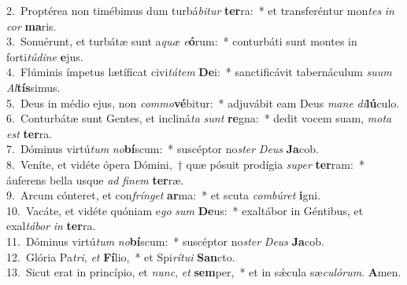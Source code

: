 {2.~}Proptérea non timébimus dum turbá\textit{bi}\textit{tur} \textbf{ter}ra:~* et transferéntur mon\textit{tes} \textit{in} \textit{cor} \textbf{ma}ris.\\
{3.~}Sonuérunt, et turbátæ sunt a\textit{quæ} \textit{e}\textbf{ó}rum:~* conturbáti sunt montes in forti\textit{tú}\textit{di}\textit{ne} \textbf{e}jus.\\
{4.~}Flúminis ímpetus lætíficat civi\textit{tá}\textit{tem} \textbf{De}i:~* sanctificávit tabernáculum \textit{su}\textit{um} \textit{Al}\textbf{tís}simus.\\
{5.~}Deus in médio ejus, non \textit{com}\textit{mo}\textbf{vé}bitur:~* adjuvábit eam Deus \textit{ma}\textit{ne} \textit{di}\textbf{lú}culo.\\
{6.~}Conturbátæ sunt Gentes, et incliná\textit{ta} \textit{sunt} \textbf{re}gna:~* dedit vocem suam, \textit{mo}\textit{ta} \textit{est} \textbf{ter}ra.\\
{7.~}Dóminus virtú\textit{tum} \textit{no}\textbf{bí}scum:~* suscéptor no\textit{ster} \textit{De}\textit{us} \textbf{Ja}cob.\\
{8.~}Veníte, et vidéte ópera Dómini,~† quæ pósuit prodígia \textit{su}\textit{per} \textbf{ter}ram:~* áuferens bella usque \textit{ad} \textit{fi}\textit{nem} \textbf{ter}ræ.\\
{9.~}Arcum cónteret, et con\textit{frín}\textit{get} \textbf{ar}ma:~* et scuta \textit{com}\textit{bú}\textit{ret} \textbf{i}gni.\\
{10.~}Vacáte, et vidéte quóniam e\textit{go} \textit{sum} \textbf{De}us:~* exaltábor in Géntibus, et exal\textit{tá}\textit{bor} \textit{in} \textbf{ter}ra.\\
{11.~}Dóminus virtú\textit{tum} \textit{no}\textbf{bí}scum:~* suscéptor no\textit{ster} \textit{De}\textit{us} \textbf{Ja}cob.\\
{12.~}Glória Pa\textit{tri}, \textit{et} \textbf{Fí}lio,~* et Spi\textit{rí}\textit{tu}\textit{i} \textbf{San}cto.\\
{13.~}Sicut erat in princípio, et \textit{nunc}, \textit{et} \textbf{sem}per,~* et in sǽcula sæ\textit{cu}\textit{ló}\textit{rum}. \textbf{A}men.\\
